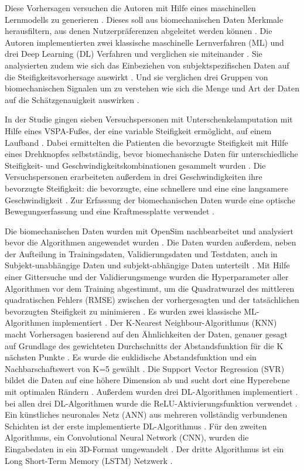 Diese Vorhersagen versuchen die Autoren mit Hilfe eines maschinellen Lernmodells zu generieren \cite{Shetty.2022}. Dieses soll aus biomechanischen Daten Merkmale herausfiltern, aus denen Nutzerpräferenzen abgeleitet werden können \cite{Shetty.2022}. 
Die Autoren implementierten zwei klassische maschinelle Lernverfahren (ML) und drei Deep Learning (DL) Verfahren und verglichen sie miteinander \cite{Shetty.2022}. 
Sie analysierten zudem wie sich das Einbeziehen von subjektspezifischen Daten auf die Steifigkeitsvorhersage auswirkt \cite{Shetty.2022}. Und sie verglichen drei Gruppen von biomechanischen Signalen um zu verstehen wie sich die Menge und Art der Daten auf die Schätzgenauigkeit auswirken \cite{Shetty.2022}. 

In der Studie gingen sieben Versuchspersonen mit Unterschenkelamputation mit Hilfe eines VSPA-Fußes, der eine variable Steifigkeit ermöglicht, auf einem Laufband \cite{Shetty.2022}. Dabei ermittelten die Patienten die bevorzugte Steifigkeit mit Hilfe eines Drehknopfes selbstständig, bevor biomechanische Daten für unterschiedliche Steifigkeit- und Geschwindigkeitskombinationen gesammelt wurden \cite{Shetty.2022}. Die Versuchspersonen erarbeiteten außerdem in drei Geschwindigkeiten ihre bevorzugte Steifigkeit: die bevorzugte, eine schnellere und eine eine langsamere Geschwindigkeit \cite{Shetty.2022}. Zur Erfassung der biomechanischen Daten wurde eine optische Bewegungserfassung und eine Kraftmessplatte verwendet \cite{Shetty.2022}.

Die biomechanischen Daten wurden mit OpenSim nachbearbeitet und analysiert bevor die Algorithmen angewendet wurden \cite{Shetty.2022}. Die Daten wurden außerdem, neben der Aufteilung in Trainingsdaten, Validierungsdaten und Testdaten, auch in Subjekt-unabhängige Daten und subjekt-abhängige Daten unterteilt \cite{Shetty.2022}. Mit Hilfe einer Gittersuche und der Validierungsmenge wurden die Hyperparameter aller Algorithmen vor dem Training abgestimmt, um die Quadratwurzel des mittleren quadratischen Fehlers (RMSE) zwischen der vorhergesagten und der tatsächlichen bevorzugten Steifigkeit zu minimieren \cite{Shetty.2022}.
Es wurden zwei klassische ML-Algorithmen implementiert \cite{Shetty.2022}. Der K-Nearest Neighbour-Algorithmus (KNN) macht Vorhersagen basierend auf den Ähnlichkeiten der Daten, genauer gesagt auf Grundlage des gewichteten Durchschnitts der Abstandsfunktion für die K nächsten Punkte \cite{Shetty.2022}. Es wurde die euklidische Abstandsfunktion und ein Nachbarschaftswert von K=5 gewählt \cite{Shetty.2022}. Die Support Vector Regression (SVR) bildet die Daten auf eine höhere Dimension ab und sucht dort eine Hyperebene mit optimalen Rändern \cite{Shetty.2022}. Außerdem wurden drei DL-Algorithmen implementiert \cite{Shetty.2022}. bei allen drei DL-Algorithmen wurde die ReLU-Aktivierungsfunktion verwendet \cite{Shetty.2022}. Ein künstliches neuronales Netz (ANN) aus mehreren vollständig verbundenen Schichten ist der erste implementierte DL-Algorithmus \cite{Shetty.2022}. Für den zweiten Algorithmus, ein Convolutional Neural Network (CNN), wurden die Eingabedaten in ein 3D-Format umgewandelt \cite{Shetty.2022}. Der dritte Algorithmus ist ein Long Short-Term Memory (LSTM) Netzwerk \cite{Shetty.2022}. 

